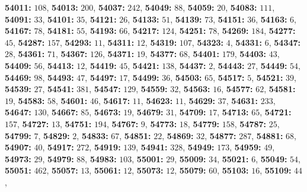 \textsf{\bfseries 54011:} $108$, \textsf{\bfseries 54013:} $200$, \textsf{\bfseries 54037:} $242$, \textsf{\bfseries 54049:} $88$, \textsf{\bfseries 54059:} $20$, \textsf{\bfseries 54083:} $111$, \textsf{\bfseries 54091:} $33$, \textsf{\bfseries 54101:} $35$, \textsf{\bfseries 54121:} $26$, \textsf{\bfseries 54133:} $51$, \textsf{\bfseries 54139:} $73$, \textsf{\bfseries 54151:} $36$, \textsf{\bfseries 54163:} $6$, \textsf{\bfseries 54167:} $78$, \textsf{\bfseries 54181:} $55$, \textsf{\bfseries 54193:} $66$, \textsf{\bfseries 54217:} $124$, \textsf{\bfseries 54251:} $78$, \textsf{\bfseries 54269:} $184$, \textsf{\bfseries 54277:} $45$, \textsf{\bfseries 54287:} $157$, \textsf{\bfseries 54293:} $11$, \textsf{\bfseries 54311:} $12$, \textsf{\bfseries 54319:} $107$, \textsf{\bfseries 54323:} $4$, \textsf{\bfseries 54331:} $6$, \textsf{\bfseries 54347:} $28$, \textsf{\bfseries 54361:} $71$, \textsf{\bfseries 54367:} $126$, \textsf{\bfseries 54371:} $19$, \textsf{\bfseries 54377:} $68$, \textsf{\bfseries 54401:} $179$, \textsf{\bfseries 54403:} $43$, \textsf{\bfseries 54409:} $56$, \textsf{\bfseries 54413:} $12$, \textsf{\bfseries 54419:} $45$, \textsf{\bfseries 54421:} $138$, \textsf{\bfseries 54437:} $2$, \textsf{\bfseries 54443:} $27$, \textsf{\bfseries 54449:} $54$, \textsf{\bfseries 54469:} $98$, \textsf{\bfseries 54493:} $47$, \textsf{\bfseries 54497:} $17$, \textsf{\bfseries 54499:} $36$, \textsf{\bfseries 54503:} $65$, \textsf{\bfseries 54517:} $5$, \textsf{\bfseries 54521:} $39$, \textsf{\bfseries 54539:} $27$, \textsf{\bfseries 54541:} $381$, \textsf{\bfseries 54547:} $129$, \textsf{\bfseries 54559:} $32$, \textsf{\bfseries 54563:} $16$, \textsf{\bfseries 54577:} $62$, \textsf{\bfseries 54581:} $19$, \textsf{\bfseries 54583:} $58$, \textsf{\bfseries 54601:} $46$, \textsf{\bfseries 54617:} $11$, \textsf{\bfseries 54623:} $11$, \textsf{\bfseries 54629:} $37$, \textsf{\bfseries 54631:} $233$, \textsf{\bfseries 54647:} $130$, \textsf{\bfseries 54667:} $85$, \textsf{\bfseries 54673:} $19$, \textsf{\bfseries 54679:} $31$, \textsf{\bfseries 54709:} $17$, \textsf{\bfseries 54713:} $65$, \textsf{\bfseries 54721:} $157$, \textsf{\bfseries 54727:} $13$, \textsf{\bfseries 54751:} $194$, \textsf{\bfseries 54767:} $9$, \textsf{\bfseries 54773:} $18$, \textsf{\bfseries 54779:} $158$, \textsf{\bfseries 54787:} $25$, \textsf{\bfseries 54799:} $7$, \textsf{\bfseries 54829:} $2$, \textsf{\bfseries 54833:} $67$, \textsf{\bfseries 54851:} $22$, \textsf{\bfseries 54869:} $32$, \textsf{\bfseries 54877:} $287$, \textsf{\bfseries 54881:} $68$, \textsf{\bfseries 54907:} $40$, \textsf{\bfseries 54917:} $272$, \textsf{\bfseries 54919:} $139$, \textsf{\bfseries 54941:} $328$, \textsf{\bfseries 54949:} $173$, \textsf{\bfseries 54959:} $49$, \textsf{\bfseries 54973:} $29$, \textsf{\bfseries 54979:} $88$, \textsf{\bfseries 54983:} $103$, \textsf{\bfseries 55001:} $29$, \textsf{\bfseries 55009:} $34$, \textsf{\bfseries 55021:} $6$, \textsf{\bfseries 55049:} $54$, \textsf{\bfseries 55051:} $462$, \textsf{\bfseries 55057:} $13$, \textsf{\bfseries 55061:} $12$, \textsf{\bfseries 55073:} $12$, \textsf{\bfseries 55079:} $60$, \textsf{\bfseries 55103:} $16$, \textsf{\bfseries 55109:} $44$, 
